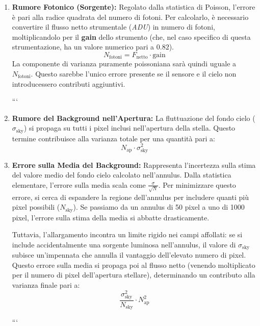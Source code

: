 \begin{enumerate}
\item \textbf{Rumore Fotonico (Sorgente):} Regolato dalla statistica di Poisson, l'errore è pari alla radice quadrata del numero di fotoni. Per calcolarlo, è necessario convertire il flusso netto strumentale (\textit{ADU}) in numero di fotoni, moltiplicandolo per il \textbf{gain} dello strumento (che, nel caso specifico di questa strumentazione, ha un valore numerico pari a $0.82$).
\begin{equation}
N_{\text{fotoni}} = F_{\text{netto}} \cdot \text{gain}
\end{equation}
La componente di varianza puramente poissoniana sarà quindi uguale a $N_{\text{fotoni}}$. Questo sarebbe l'unico errore presente se il sensore e il cielo non introducessero contributi aggiuntivi.

```
\item \textbf{Rumore del Background nell'Apertura:} La fluttuazione del fondo cielo ($\sigma_{\text{sky}}$) si propaga su tutti i pixel inclusi nell'apertura della stella. Questo termine contribuisce alla varianza totale per una quantità pari a:
\begin{equation}
N_{\text{ap}} \cdot \sigma_{\text{sky}}^2
\end{equation}

\item \textbf{Errore sulla Media del Background:} Rappresenta l'incertezza sulla stima del valore medio del fondo cielo calcolato nell'annulus. Dalla statistica elementare, l'errore sulla media scala come $\frac{\sigma}{\sqrt{N}}$. Per minimizzare questo errore, si cerca di espandere la regione dell'annulus per includere quanti più pixel possibili ($N_{\text{sky}}$). Se passiamo da un annulus di 50 pixel a uno di 1000 pixel, l'errore sulla stima della media si abbatte drasticamente.

Tuttavia, l'allargamento incontra un limite rigido nei campi affollati: se si include accidentalmente una sorgente luminosa nell'annulus, il valore di $\sigma_{\text{sky}}$ subisce un'impennata che annulla il vantaggio dell'elevato numero di pixel. Questo errore sulla media si propaga poi al flusso netto (venendo moltiplicato per il numero di pixel dell'apertura stellare), determinando un contributo alla varianza finale pari a:
\begin{equation}
\frac{\sigma_{\text{sky}}^2}{N_{\text{sky}}} \cdot N_{\text{ap}}^2
\end{equation}

```

\end{enumerate}

